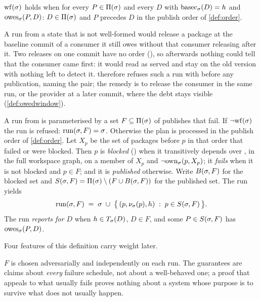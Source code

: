 \begin{definition}
\label{def:wf}
$\mathrm{wf}(\sigma)$ holds when for every $P \in \Pi(\sigma)$ and every $D$ with
$\mathrm{basec}_{\sigma}(D) = h$ and $\mathrm{owes}_{\sigma}(P,D)$: $D \in \Pi(\sigma)$ and $P$
precedes $D$ in the publish order of \cref{def:order}.
\end{definition}

A run from a state that is not well-formed would release a package at the
baseline commit of a consumer it still owes without that consumer releasing
after it. Two releases on one commit have no order (), so
afterwards nothing could tell that the consumer came first: it would read as
served and stay on the old version with nothing left to detect it. 
therefore refuses such a run with  before any publication, naming
the pair; the remedy is to release the consumer in the same run, or the
provider at a later commit, where the debt stays visible (\cref{def:owedwindow}).

\begin{definition}
\label{def:run}
A run from \st{} is parameterised by a set $F \subseteq \Pi(\sigma)$ of
publishes that fail. If $\lnot\mathrm{wf}(\sigma)$ the run is refused: $\mathrm{run}(\sigma,F) =
\sigma$. Otherwise the plan is processed in the publish order of \cref{def:order}.
Let $X_p$ be the set of packages before $p$ in that order that failed or were
blocked. Then $p$ is \emph{blocked} () when it transitively depends
over \Kblock{}, in the full workspace graph, on a member of $X_p$ and
$\lnot\mathrm{own}_{\sigma}(p,X_p)$; it \emph{fails} when it is not blocked and $p
\in F$; and it is \emph{published} otherwise. Write $B(\sigma,F)$ for the
blocked set and $S(\sigma,F) = \Pi(\sigma)\setminus(F \cup
B(\sigma,F))$ for the published set. The run yields
\[
  \mathrm{run}(\sigma,F) \;=\; \sigma \;\cup\;
  \bigl\{\,(p, \nu_{\sigma}(p), h) \;:\; p \in S(\sigma,F)\,\bigr\}.
\]
The run \emph{reports  for $D$} when $h \in T_{\sigma}(D)$, $D
\in F$, and some $P \in S(\sigma,F)$ has $\mathrm{owes}_{\sigma}(P,D)$.
\end{definition}

Four features of this definition carry weight later.

$F$ is chosen adversarially and independently on each run. The guarantees are
claims about \emph{every} failure schedule, not about a well-behaved one; a
proof that appeals to what usually fails proves nothing about a system whose
purpose is to survive what does not usually happen.

